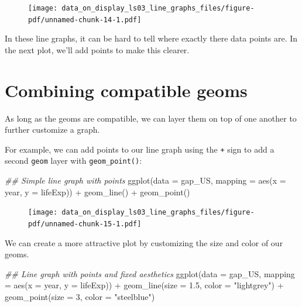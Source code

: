 \documentclass[
  letterpaper,
  DIV=11,
  numbers=noendperiod]{scrreprt}
\newenvironment{Shaded}{\begin{snugshade}}{\end{snugshade}}
\newcommand{\AttributeTok}[1]{\textcolor[rgb]{0.40,0.45,0.13}{#1}}
\newcommand{\DecValTok}[1]{\textcolor[rgb]{0.68,0.00,0.00}{#1}}
\newcommand{\DocumentationTok}[1]{\textcolor[rgb]{0.37,0.37,0.37}{\textit{#1}}}
\newcommand{\FloatTok}[1]{\textcolor[rgb]{0.68,0.00,0.00}{#1}}
\newcommand{\FunctionTok}[1]{\textcolor[rgb]{0.28,0.35,0.67}{#1}}
\newcommand{\NormalTok}[1]{\textcolor[rgb]{0.00,0.23,0.31}{#1}}
\newcommand{\SpecialCharTok}[1]{\textcolor[rgb]{0.37,0.37,0.37}{#1}}
\newcommand{\StringTok}[1]{\textcolor[rgb]{0.13,0.47,0.30}{#1}}
\begin{document}
\begin{figure}[H]

{\centering \texttt{[image: data\_on\_display\_ls03\_line\_graphs\_files/figure-pdf/unnamed-chunk-14-1.pdf]}

}

\end{figure}

In these line graphs, it can be hard to tell where exactly there data
points are. In the next plot, we'll add points to make this clearer.

\hypertarget{combining-compatible-geoms}{%
\section{Combining compatible geoms}\label{combining-compatible-geoms}}

As long as the geoms are compatible, we can layer them on top of one
another to further customize a graph.

For example, we can add points to our line graph using the \texttt{+}
sign to add a second \texttt{geom} layer with \texttt{geom\_point()}:

\begin{Shaded}
\begin{Highlighting}[]
\DocumentationTok{\#\# Simple line graph with points}
\FunctionTok{ggplot}\NormalTok{(}\AttributeTok{data =}\NormalTok{ gap\_US, }
       \AttributeTok{mapping =} \FunctionTok{aes}\NormalTok{(}\AttributeTok{x =}\NormalTok{ year,}
                     \AttributeTok{y =}\NormalTok{ lifeExp)) }\SpecialCharTok{+}
  \FunctionTok{geom\_line}\NormalTok{() }\SpecialCharTok{+}
  \FunctionTok{geom\_point}\NormalTok{()}
\end{Highlighting}
\end{Shaded}

\begin{figure}[H]

{\centering \texttt{[image: data\_on\_display\_ls03\_line\_graphs\_files/figure-pdf/unnamed-chunk-15-1.pdf]}

}

\end{figure}

We can create a more attractive plot by customizing the size and color
of our geoms.

\begin{Shaded}
\begin{Highlighting}[]
\DocumentationTok{\#\# Line graph with points and fixed aesthetics}
\FunctionTok{ggplot}\NormalTok{(}\AttributeTok{data =}\NormalTok{ gap\_US, }
       \AttributeTok{mapping =} \FunctionTok{aes}\NormalTok{(}\AttributeTok{x =}\NormalTok{ year,}
                     \AttributeTok{y =}\NormalTok{ lifeExp)) }\SpecialCharTok{+}
  \FunctionTok{geom\_line}\NormalTok{(}\AttributeTok{size =} \FloatTok{1.5}\NormalTok{, }
            \AttributeTok{color =} \StringTok{"lightgrey"}\NormalTok{) }\SpecialCharTok{+}
  \FunctionTok{geom\_point}\NormalTok{(}\AttributeTok{size =} \DecValTok{3}\NormalTok{, }
             \AttributeTok{color =} \StringTok{"steelblue"}\NormalTok{)}
\end{Highlighting}
\end{Shaded}
\end{document}
